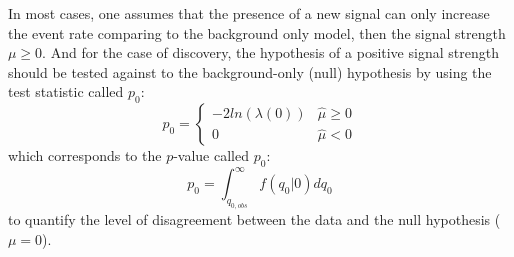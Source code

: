 In most cases, one assumes that the presence of a new signal can only increase the event rate comparing to the background only model,
then the signal strength $\mu \ge 0$.
And for the case of discovery, the hypothesis of a positive signal strength should be tested against to the background-only (null) hypothesis by using the test statistic called $p_0$:
\begin{equation}
    p_0 = 
    \begin{cases}
        -2 ln(\lambda(0)) &\hat{\mu} \ge 0 \\
        0                 &\hat{\mu} < 0
    \end{cases}
\end{equation}
which corresponds to the $p$-value called $p_0$:
\begin{equation}
    p_0 = \int_{q_{0, obs}}^{\infty} f(q_0|0) d q_0
\end{equation}
to quantify the level of disagreement between the data and the null hypothesis ($\mu = 0$).
